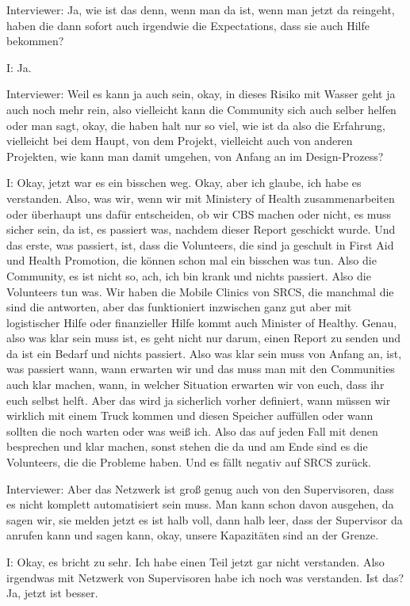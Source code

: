 Interviewer: Ja, wie ist das denn, wenn man da ist, wenn man jetzt da reingeht, haben die dann sofort auch irgendwie die Expectations, dass sie auch Hilfe bekommen? 

I: Ja.

Interviewer: Weil es kann ja auch sein, okay, in dieses Risiko mit Wasser geht ja auch noch mehr rein, also vielleicht kann die Community sich auch selber helfen oder man sagt, okay, die haben halt nur so viel, wie ist da also die Erfahrung, vielleicht bei dem Haupt, von dem Projekt, vielleicht auch von anderen Projekten, wie kann man damit umgehen, von Anfang an im Design-Prozess? 

I: Okay, jetzt war es ein bisschen weg. Okay, aber ich glaube, ich habe es verstanden. Also, was wir, wenn wir mit Ministery of Health zusammenarbeiten oder überhaupt uns dafür entscheiden, ob wir CBS machen oder nicht, es muss sicher sein, da ist, es passiert was, nachdem dieser Report geschickt wurde. Und das erste, was passiert, ist, dass die Volunteers, die sind ja geschult in First Aid und Health Promotion, die können schon mal ein bisschen was tun. Also die Community, es ist nicht so, ach, ich bin krank und nichts passiert. Also die Volunteers tun was. Wir haben die Mobile Clinics von SRCS, die manchmal die sind die antworten, aber das funktioniert inzwischen ganz gut aber mit logistischer Hilfe oder finanzieller Hilfe kommt auch Minister of Healthy. Genau, also was klar sein muss ist, es geht nicht nur darum, einen Report zu senden und da ist ein Bedarf und nichts passiert. Also was klar sein muss von Anfang an, ist, was passiert wann, wann erwarten wir und das muss man mit den Communities auch klar machen, wann, in welcher Situation erwarten wir von euch, dass ihr euch selbst helft. Aber das wird ja sicherlich vorher definiert, wann müssen wir wirklich mit einem Truck kommen und diesen Speicher auffüllen oder wann sollten die noch warten oder was weiß ich. Also das auf jeden Fall mit denen besprechen und klar machen, sonst stehen die da und am Ende sind es die Volunteers, die die Probleme haben. Und es fällt negativ auf SRCS zurück.

Interviewer: Aber das Netzwerk ist groß genug auch von den Supervisoren, dass es nicht komplett automatisiert sein muss. Man kann schon davon ausgehen, da sagen wir, sie melden jetzt es ist halb voll, dann halb leer, dass der Supervisor da anrufen kann und sagen kann, okay, unsere Kapazitäten sind an der Grenze.

I: Okay, es bricht zu sehr. Ich habe einen Teil jetzt gar nicht verstanden. Also irgendwas mit Netzwerk von Supervisoren habe ich noch was verstanden. Ist das? Ja, jetzt ist besser. 

